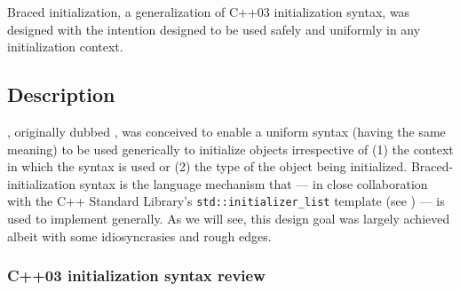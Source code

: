 

\setcounter{table}{0}
\setcounter{footnote}{0}
\setcounter{lstlisting}{0}

Braced initialization, a generalization of C++03 initialization syntax,
was designed with the intention designed to be used safely and uniformly
in any initialization context.

\subsection[Description]{Description}\label{description}

, originally dubbed , was conceived to enable a uniform syntax (having the
same meaning) to be used generically to initialize objects irrespective
of (1) the context in which the syntax is used or (2) the type of the
object being initialized. Braced-initialization syntax is the language
mechanism that --- in close collaboration with the C++ Standard
Library's \lstinline!std::initializer_list! template (see ) --- is used to implement
 generally. As we will see, this design goal
was largely achieved albeit with some idiosyncrasies and rough edges.

\subsubsection[C++03 initialization syntax review]{C++03 initialization syntax review}\label{c++03-initialization-syntax-review}

